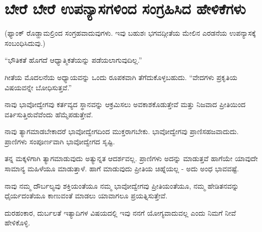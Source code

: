 
\chapter{ಬೇರೆ ಬೇರೆ ಉಪನ್ಯಾಸಗಳಿಂದ ಸಂಗ್ರಹಿಸಿದ ಹೇಳಿಕೆಗಳು}

(ಫ್ಯಾಂಕ್ ರೊಡ್ಹಾಮಲ್ರಿಂದ ಸಂಗ್ರಹವಾದುವುಗಳು. ಇವು ಬಹುಶಃ ಭಗವದ್ಗೀತೆಯ ಮೇಲಿನ ಎರಡನೆಯ ಉಪನ್ಯಾಸಕ್ಕೆ ಸಂಬಂಧಿಸಿದುವು.)

“ಭೌತಿಕತೆ ಹೊಗದೆ ಆಧ್ಯಾತ್ಮಿಕತೆಯನ್ನು ಪಡೆಯಲಾಗುವುದಿಲ್ಲ.”

ಗೀತೆಯ ಮೊದಲನೆಯ ಅಧ್ಯಾಯವನ್ನು ಒಂದು ರೂಪಕವಾಗಿ ತೆಗೆದುಕೊಳ್ಳಬಹುದು. “ವೇದಗಳು ಪ್ರಕೃತಿಯ ವಿಷಯವನ್ನೇ ಬೋಧಿಸುತ್ತವೆ.”

ನಾವು ಭಾವೋದ್ವೇಗವು ಕರ್ತವ್ಯದ ಸ್ಥಾನವನ್ನು ಆಕ್ರಮಿಸಲು ಅವಕಾಶಕೊಡುತ್ತೇವೆ ಮತ್ತು ನಿಜವಾದ ಪ್ರೀತಿಯಿಂದ ವರ್ತಿಸುತ್ತಿರುವೆವೆಂದು ಹೆಮ್ಮೆಪಡುತ್ತೇವೆ.

ನಾವು ತ್ಯಾಗಮಾಡಬೇಕಾದರೆ ಭಾವೋದ್ವೇಗದಿಂದ ಮುಕ್ತರಾಗಬೇಕು. ಭಾವೋದ್ವೇಗವು ಪ್ರಾಣಿಸಹಜವಾದುದು. ಪ್ರಾಣಿಗಳು ಸಂಪೂರ್ಣವಾಗಿ ಭಾವೋದ್ವೇಗದ ಸೃಷ್ಟಿ.

ತನ್ನ ಮಕ್ಕಳಿಗಾಗಿ ತ್ಯಾಗಮಾಡುವುದು ಅತ್ಯುನ್ನತ ಆದರ್ಶವಲ್ಲ. ಪ್ರಾಣಿಗಳು ಅದನ್ನು ಮಾಡುತ್ತವೆ ಹಾಗೆಯೇ ಯಾವುದೇ ಸಾಮಾನ್ಯ ಮಹಿಳೆಯೂ ಮಾಡುತ್ತಾಳೆ. ಹಾಗೆ ಮಾಡುವುದು ಪ್ರೀತಿಯ ಚಿಹ್ನೆಯಲ್ಲ - ಅದು ಅಂಧ ಭಾವವಷ್ಟೆ.

ನಾವು ನಮ್ಮ ದೌರ್ಬಲ್ಯವು ಶಕ್ತಿಯಂತೆಯೂ ನಮ್ಮ ಭಾವೋದ್ವೇಗವು ಪ್ರೀತಿಯಂತೆಯೂ, ನಮ್ಮ ಹೇಡಿತನವನ್ನು ಧೈರ್ಯದಂತೆಯೂ ಕಾಣುವಂತೆ ಮಾಡಲು ಯಾವಾಗಲೂ ಪ್ರಯತ್ನಿಸುತ್ತೇವೆ.

ದುರಹಂಕಾರ, ದುರ್ಬಲತೆ ಇತ್ಯಾದಿಗಳ ವಿಷಯದಲ್ಲಿ ಇವು ನನಗೆ ಯೋಗ್ಯವಾದುವಲ್ಲ ಎಂದು ನಿಮಗೆ ನೀವೆ ಹೇಳಿಕೊಳ್ಳಿ.

